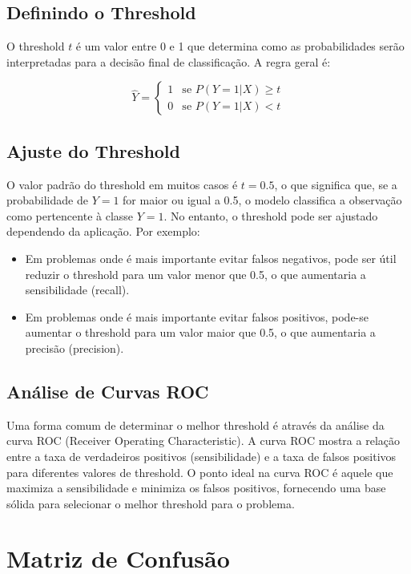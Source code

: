 \documentclass{sciposter}
\begin{document}
\begin{multicols}{3}
\subsection{Definindo o Threshold}
O threshold \( t \) é um valor entre 0 e 1 que determina como as probabilidades serão interpretadas para a decisão final de classificação. A regra geral é:

\[
\hat{Y} = 
\begin{cases} 
1 & \text{se } P(Y = 1 | X) \geq t \\
0 & \text{se } P(Y = 1 | X) < t
\end{cases}
\]

\subsection{Ajuste do Threshold}
O valor padrão do threshold em muitos casos é \( t = 0.5 \), o que significa que, se a probabilidade de \( Y = 1 \) for maior ou igual a 0.5, o modelo classifica a observação como pertencente à classe \( Y = 1 \). No entanto, o threshold pode ser ajustado dependendo da aplicação. Por exemplo:

\begin{itemize}
    \item Em problemas onde é mais importante evitar falsos negativos, pode ser útil reduzir o threshold para um valor menor que 0.5, o que aumentaria a sensibilidade (recall).
    \item Em problemas onde é mais importante evitar falsos positivos, pode-se aumentar o threshold para um valor maior que 0.5, o que aumentaria a precisão (precision).
\end{itemize}

\subsection{Análise de Curvas ROC}
Uma forma comum de determinar o melhor threshold é através da análise da curva ROC (Receiver Operating Characteristic). A curva ROC mostra a relação entre a taxa de verdadeiros positivos (sensibilidade) e a taxa de falsos positivos para diferentes valores de threshold. O ponto ideal na curva ROC é aquele que maximiza a sensibilidade e minimiza os falsos positivos, fornecendo uma base sólida para selecionar o melhor threshold para o problema.

\section{Matriz de Confusão}


\end{multicols}
\end{document}
